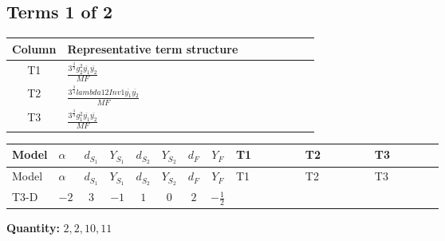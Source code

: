 \documentclass[8pt]{article}
\begin{document}
\begin{landscape}
\subsection*{Terms 1 of 2}
\begin{center}
\begin{tabular}{@{}c >{\raggedright\arraybackslash}p{0.82\linewidth}@{}}
\toprule
Column & Representative term structure \\
\midrule
T1 & \(\displaystyle \frac{3^{\frac{3}{4}} g_{2}^{2} \overline{y_{1}} \overline{y_{2}}}{MF}\) \\
\midrule
T2 & \(\displaystyle \frac{3^{\frac{3}{4}} lambda12Inv1 \overline{y_{1}} \overline{y_{2}}}{MF}\) \\
\midrule
T3 & \(\displaystyle \frac{3^{\frac{3}{4}} g_{1}^{2} \overline{y_{1}} \overline{y_{2}}}{MF}\) \\
\midrule
\bottomrule
\end{tabular}
\end{center}
\smallskip
\tiny
\begin{longtable}{@{}llcccccc >{\raggedright\arraybackslash}p{0.21\linewidth} >{\raggedright\arraybackslash}p{0.21\linewidth} >{\raggedright\arraybackslash}p{0.21\linewidth}@{}}
\toprule
Model & $\alpha$ & $d_{S_1}$ & $Y_{S_1}$ & $d_{S_2}$ & $Y_{S_2}$ & $d_F$ & $Y_F$ & T1 & T2 & T3 \\
\midrule
\endfirsthead
\toprule
Model & $\alpha$ & $d_{S_1}$ & $Y_{S_1}$ & $d_{S_2}$ & $Y_{S_2}$ & $d_F$ & $Y_F$ & T1 & T2 & T3 \\
\midrule
\endhead
T3-D & $-2$ & $3$ & $-1$ & $1$ & $0$ & $2$ & $-\frac{1}{2}$ & \scriptsize\adjustbox{max width=\linewidth}{$\begin{gathered} - \frac{17 \cdot 3^{\frac{3}{4}} g_{2}^{2} \overline{y_{1}} \overline{y_{2}}}{24 MF}\end{gathered}$} & \scriptsize\adjustbox{max width=\linewidth}{$\begin{gathered} - \frac{3^{\frac{3}{4}} lambda12Inv1 \overline{y_{1}} \overline{y_{2}}}{6 MF}\end{gathered}$} & \scriptsize\adjustbox{max width=\linewidth}{$\begin{gathered} - \frac{3^{\frac{3}{4}} g_{1}^{2} \overline{y_{1}} \overline{y_{2}}}{8 MF}\end{gathered}$} \\
\midrule
\bottomrule
\end{longtable}
\clearpage
\noindent\textbf{Quantity: }$\mathrm{2,2,10,11}$\par\smallskip

\end{landscape}
\end{document}
